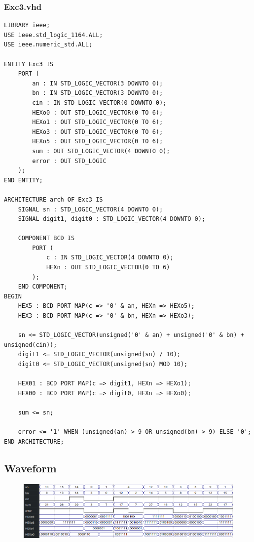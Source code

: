 \documentclass[13pt,a4paper]{report}
\begin{document}
\subsubsection{Exc3.vhd}
\begin{verbatim}
LIBRARY ieee;
USE ieee.std_logic_1164.ALL;
USE ieee.numeric_std.ALL;

ENTITY Exc3 IS
	PORT (
		an : IN STD_LOGIC_VECTOR(3 DOWNTO 0);
		bn : IN STD_LOGIC_VECTOR(3 DOWNTO 0);
		cin : IN STD_LOGIC_VECTOR(0 DOWNTO 0);
		HEXo0 : OUT STD_LOGIC_VECTOR(0 TO 6);
		HEXo1 : OUT STD_LOGIC_VECTOR(0 TO 6);
		HEXo3 : OUT STD_LOGIC_VECTOR(0 TO 6);
		HEXo5 : OUT STD_LOGIC_VECTOR(0 TO 6);
		sum : OUT STD_LOGIC_VECTOR(4 DOWNTO 0);
		error : OUT STD_LOGIC
	);
END ENTITY;

ARCHITECTURE arch OF Exc3 IS
	SIGNAL sn : STD_LOGIC_VECTOR(4 DOWNTO 0);
	SIGNAL digit1, digit0 : STD_LOGIC_VECTOR(4 DOWNTO 0);

	COMPONENT BCD IS
		PORT (
			c : IN STD_LOGIC_VECTOR(4 DOWNTO 0);
			HEXn : OUT STD_LOGIC_VECTOR(0 TO 6)
		);
	END COMPONENT;
BEGIN
	HEX5 : BCD PORT MAP(c => '0' & an, HEXn => HEXo5);
	HEX3 : BCD PORT MAP(c => '0' & bn, HEXn => HEXo3);

	sn <= STD_LOGIC_VECTOR(unsigned('0' & an) + unsigned('0' & bn) + unsigned(cin));
	digit1 <= STD_LOGIC_VECTOR(unsigned(sn) / 10);
	digit0 <= STD_LOGIC_VECTOR(unsigned(sn) MOD 10);

	HEX01 : BCD PORT MAP(c => digit1, HEXn => HEXo1);
	HEX00 : BCD PORT MAP(c => digit0, HEXn => HEXo0);

	sum <= sn;

	error <= '1' WHEN (unsigned(an) > 9 OR unsigned(bn) > 9) ELSE '0';
END ARCHITECTURE;
\end{verbatim}

\subsection{Waveform}
\begin{figure}[H]
\centering
\includegraphics[scale=0.7]{images/Exc2_waveform.png}
\end{figure}
\end{document}
